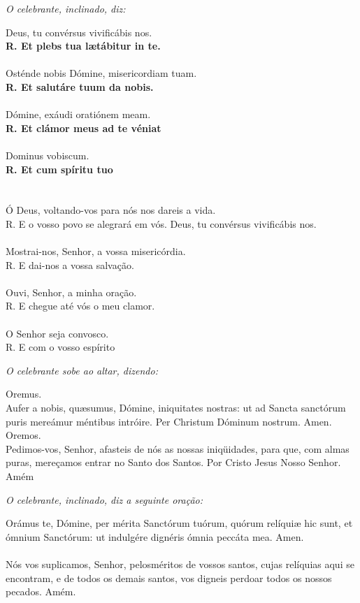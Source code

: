 \textit{O celebrante, inclinado, diz:}
\begin{multicols}{2}
\noindent Deus, tu convérsus vivificábis nos.
\\ \textbf{R. Et plebs tua lætábitur in te.}
\\
\\ Osténde nobis Dómine, misericordiam tuam. 
\\ \textbf{R. Et salutáre tuum da nobis.}
\\
\\ Dómine, exáudi oratiónem meam.
\\ \textbf{R. Et clámor meus ad te véniat}
\\
\\ Dominus vobiscum.
\\ \textbf{R. Et cum spíritu tuo}
\\
\\
\\ Ó Deus, voltando-vos para nós nos dareis a vida.
\\ R. E o vosso povo se alegrará em vós. Deus, tu convérsus vivificábis nos.
\\
\\ Mostrai-nos, Senhor, a vossa misericórdia.
\\ R. E dai-nos a vossa salvação.
\\
\\ Ouvi, Senhor, a minha oração.
\\ R. E chegue até vós o meu clamor.
\\
\\ O Senhor seja convosco.
\\ R. E com o vosso espírito
\end{multicols}
\textit{O celebrante sobe ao altar, dizendo:}
\begin{multicols}{2}
\noindent
Oremus.
\\Aufer a nobis, quæsumus, Dómine, iniquitates nostras: ut ad Sancta sanctórum puris mereámur méntibus intróire. Per Christum Dóminum nostrum. Amen. 
\\Oremos.
\\Pedimos-vos, Senhor, afasteis de nós as nossas iniqüidades, para que, com
almas puras, mereçamos entrar no Santo dos Santos. Por Cristo Jesus Nosso Senhor. Amém 
\end{multicols}
\textit{O celebrante, inclinado, diz a seguinte oração:}
\begin{multicols}{2}
\noindent Orámus te, Dómine, per mérita Sanctórum tuórum, quórum relíquiæ hic	sunt, et ómnium Sanctórum: ut indulgére	dignéris ómnia peccáta mea. Amen. 
\\
\\Nós vos suplicamos, Senhor, pelosméritos de vossos santos, cujas relíquias aqui se encontram, e de todos os demais santos, vos digneis perdoar todos os nossos pecados. Amém.
 
\end{multicols}
